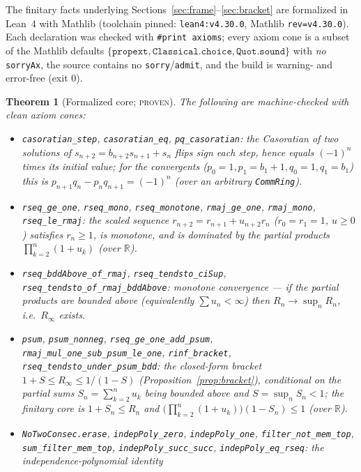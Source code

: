 \documentclass[11pt]{article}
\newtheorem{theorem}{Theorem}
\newcommand{\R}{\mathbb{R}}
\newcommand{\Rinf}{R_\infty}
\begin{document}
The finitary facts underlying Sections~\ref{sec:frame}--\ref{sec:bracket} are
formalized in Lean~4 with Mathlib (toolchain pinned: \texttt{lean4:v4.30.0},
Mathlib \texttt{rev=v4.30.0}). Each declaration was checked with
\texttt{\#print axioms}; every axiom cone is a subset of the Mathlib defaults
$\{\texttt{propext},\texttt{Classical.choice},\texttt{Quot.sound}\}$ with \emph{no}
\texttt{sorryAx}, the source contains no \texttt{sorry}/\texttt{admit}, and the
build is warning- and error-free (exit $0$).

\begin{theorem}[Formalized core; \textsc{proven}]\label{thm:lean}
The following are machine-checked with clean axiom cones:
\begin{itemize}\sloppy
\item \texttt{casoratian\_step}, \texttt{casoratian\_eq}, \texttt{pq\_casoratian}:
the Casoratian of two solutions of $s_{n+2}=b_{n+2}s_{n+1}+s_n$ flips sign each
step, hence equals $(-1)^n$ times its initial value; for the convergents
($p_0{=}1,p_1{=}b_1{+}1,q_0{=}1,q_1{=}b_1$) this is
$p_{n+1}q_n-p_nq_{n+1}=(-1)^n$ (over an arbitrary \texttt{CommRing}).
\item \texttt{rseq\_ge\_one}, \texttt{rseq\_mono}, \texttt{rseq\_monotone},
\texttt{rmaj\_ge\_one}, \texttt{rmaj\_mono}, \texttt{rseq\_le\_rmaj}: the scaled
sequence $r_{n+2}=r_{n+1}+u_{n+2}r_n$ ($r_0{=}r_1{=}1$, $u\ge0$) satisfies
$r_n\ge1$, is monotone, and is dominated by the partial products
$\prod_{k=2}^n(1+u_k)$ (over $\R$).
\item \texttt{rseq\_bddAbove\_of\_rmaj}, \texttt{rseq\_tendsto\_ciSup},
\texttt{rseq\_tendsto\_of\_rmaj\_bddAbove}: monotone convergence --- if the partial
products are bounded above (equivalently $\sum u_n<\infty$) then $R_n\to\sup_nR_n$,
i.e.\ $\Rinf$ exists.
\item \texttt{psum}, \texttt{psum\_nonneg}, \texttt{rseq\_ge\_one\_add\_psum},
\texttt{rmaj\_mul\_one\_sub\_psum\_le\_one}, \texttt{rinf\_bracket},
\texttt{rseq\_tendsto\_under\_psum\_bdd}: the \emph{closed-form bracket}
$1+S\le\Rinf\le1/(1-S)$ (Proposition~\ref{prop:bracket}), conditional on the partial
sums $S_n=\sum_{k=2}^n u_k$ being bounded above and $S=\sup_nS_n<1$; the finitary
core is $1+S_n\le R_n$ and $\bigl(\prod_{k=2}^n(1+u_k)\bigr)(1-S_n)\le1$ (over $\R$).
\item \texttt{NoTwoConsec.erase}, \texttt{indepPoly\_zero},
\texttt{indepPoly\_one}, \texttt{filter\_not\_mem\_top},
\texttt{sum\_filter\_mem\_top}, \texttt{indepPoly\_succ\_succ},
\texttt{indepPoly\_eq\_rseq}: the \emph{independence-polynomial identity}

\end{itemize}
\end{theorem}
\end{document}

